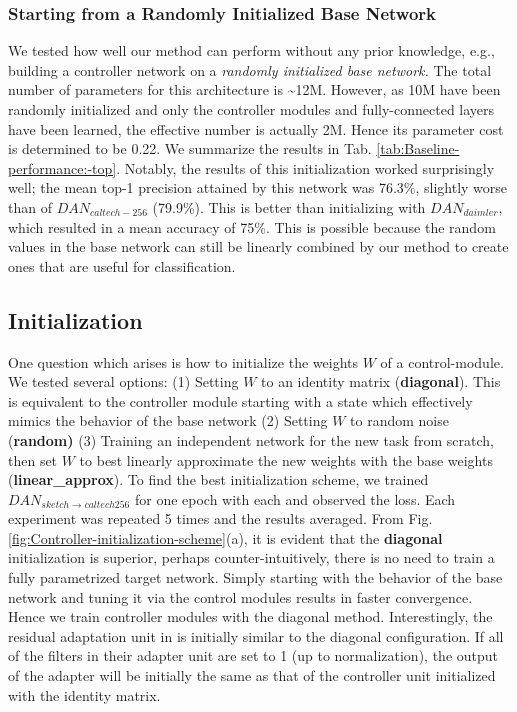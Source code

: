 \documentclass[10pt,journal,compsoc]{IEEEtran}
\makeatletter
\newcommand{\eg}{e.g.\@\xspace}
\makeatother
\begin{document}
\subsubsection{Starting from a Randomly Initialized Base Network}

We tested how well our method can perform without any prior knowledge,
\eg, building a controller network on a \emph{randomly initialized
base network. }The total number of parameters for this architecture
is \textasciitilde{}12M. However,\emph{ }as 10M have been randomly
initialized and only the controller modules and fully-connected layers
have been learned, the effective number is actually 2M. Hence its
parameter cost is determined to be 0.22. We summarize the results
in Tab. \ref{tab:Baseline-performance:-top}. Notably, the results
 of this initialization worked surprisingly well; the mean top-1 precision
attained by this network was 76.3\%, slightly worse than of $DAN_{caltech-256}$
(79.9\%). This is better than initializing with $DAN_{daimler}$,
which resulted in a mean accuracy of 75\%. This is possible because
the random values in the base network can still be linearly combined
by our method to create ones that are useful for classification.

\subsection{Initialization }

One question which arises is how to initialize the weights $W$ of
a control-module. We tested several options: (1) Setting $W$ to an
identity matrix (\textbf{diagonal}). This is equivalent to the controller
module starting with a state which effectively mimics the behavior
of the base network (2) Setting $W$ to random noise (\textbf{random)
}(3) Training an independent network for the new task from scratch,
then set $W$ to best linearly approximate the new weights with the
base weights (\textbf{linear\_approx}). To find the best initialization
scheme, we trained $DAN_{sketch\rightarrow caltech256}$ for one epoch
with each and observed the loss. Each experiment was repeated 5 times
and the results averaged. From Fig. \ref{fig:Controller-initialization-scheme}(a),
it is evident that the \textbf{diagonal} initialization is superior,
perhaps counter-intuitively, there is no need to train a fully parametrized
target network. Simply starting with the behavior of the base network
and tuning it via the control modules results in faster convergence.
Hence we train controller modules with the diagonal method. Interestingly,
the residual adaptation unit in \cite{rebuffi2017learning} is initially
similar to the diagonal configuration. If all of the filters in their
adapter unit are set to 1 (up to normalization), the output of the
adapter will be initially the same as that of the controller unit
initialized with the identity matrix.
\end{document}
